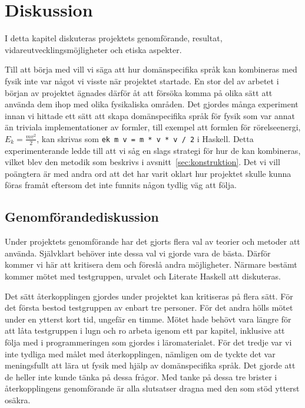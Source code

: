 
\chapter{Diskussion}\label{cha:disk}

I detta kapitel diskuteras projektets genomförande, resultat,
vidareutvecklingsmöjligheter och etiska aspekter.

Till att börja med vill vi säga att hur domänspecifika språk kan kombineras med
fysik inte var något vi visste när projektet startade. En stor del av arbetet i
början av projektet ägnades därför åt att försöka komma på olika sätt att
använda dem ihop med olika fysikaliska områden. Det gjordes många experiment
innan vi hittade ett sätt att skapa domänspecifika språk för fysik som var annat än
triviala implementationer av formler, till exempel att formlen för
rörelseenergi, $E_k = \frac{mv^2}{2}$, kan skrivas som \texttt{ek m v = m * v *
v / 2} i Haskell. Detta experimenterande ledde till att
vi såg en slags strategi för hur de kan kombineras, vilket blev den
metodik som beskrivs i avsnitt~\ref{sec:konstruktion}. Det vi vill poängtera är
med andra ord att det har varit oklart hur projektet skulle kunna föras
framåt eftersom det inte funnits någon tydlig väg att följa.

\section{Genomförandediskussion}

Under projektets genomförande har det gjorts flera val av teorier och metoder att använda. Självklart behöver inte dessa val vi gjorde vara de bästa. Därför kommer vi här att kritisera dem och föreslå andra möjligheter. Närmare bestämt kommer mötet med testgruppen, urvalet och Literate Haskell att diskuteras.

Det sätt återkopplingen gjordes under projektet kan kritiseras på flera sätt. För det första bestod testgruppen av enbart tre personer. För det andra hölls mötet under en ytterst kort tid, ungefär en timme. Mötet hade behövt vara längre för att låta testgruppen i lugn och ro arbeta igenom ett par kapitel, inklusive att följa med i programmeringen som gjordes i läromaterialet. För det tredje var vi inte tydliga med målet med återkopplingen, nämligen om de tyckte det var meningsfullt att lära ut fysik med hjälp av domänspecifika språk. Det gjorde att de heller inte kunde tänka på dessa frågor. Med tanke på dessa tre brister i återkopplingens genomförande är alla slutsatser dragna med den som stöd ytterst osäkra.

